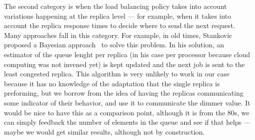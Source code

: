 The second category is when the load balancing policy takes into
account variations happening at the replica level --- for example,
when it takes into account the replica response times to decide where
to send the next request. Many approaches fall in this category. For
example, in old times, Stankovic proposed a Bayesian
approach~\cite{Stankovic:TC} to solve this problem. In his solution,
an estimator of the queue lenght per replica (in his case per
processor because cloud computing was not invened yet) is kept updated
and the next job is sent to the least congested replica. This
algorithm is very unlikely to work in our case because it has no
knowledge of the adaptation that the single replica is preforming, but
we borrow from the idea of having the replicas communicating some
indicator of their behavior, and use it to communicate the dimmer
value. It would be nice to have this as a comparison point, although
it is from the 80s, we can simply feedback the number of elements in
the queue and see if that helps --- maybe we would get similar
results, although not by construction.
